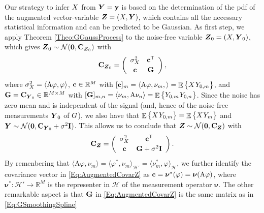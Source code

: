 \documentclass[11pt, english,english]{article}
\newcommand{\R}{ \mathbb{R}}
\def\V#1{{\boldsymbol{#1}}}         %
\def\Spc#1{{\mathcal{#1}}}  %
\def\M#1{{\bf{#1}}}  %
\def\Op#1{{\mathrm{#1}}}  %
\def\Exp{\mathop{\mathbb{E}}\nolimits}
\renewcommand{\[}{\begin{equation}}
\renewcommand{\]}[1]{\label{eq:#1}\end{equation}}
\def\Exp{\mathop{\mathbb{E}}\nolimits}
\def\Rand#1{{\uppercase{#1}}}         %
\def\VRand#1{{\uppercase{\boldsymbol #1}}}         %
\def\gRand#1{{\uppercase{ #1}}}         %
\newcommand{\Tr}{\mathsf{T}}
\begin{document}
Our strategy to infer $\Rand X$ from $\VRand Y=\M y$ is based on the determination of
the pdf of the augmented vector-variable $\VRand z=(\Rand X, \VRand Y)$, which contains all the necessary statistical information and can be predicted to be Gaussian. As first step, we apply Theorem \ref{Theo:GGaussProcess}
 to the noise-free variable  $\VRand z_0=(\Rand X, \VRand Y_0)$, which gives
$\VRand z_0\sim \Spc N(\V 0, \M C_{\VRand z_0})$ with
\begin{align}
\label{Eq:AugmentedCovar0}
\M C_{\VRand z_0}=\left(\begin{array}{cc}
\sigma_\Rand x^2  &   \M c^\Tr    \\[0.5ex]
\M c  &   \M G 
\end{array}
\right),
\end{align}
where $\sigma_\Rand x^2=\langle \Op A \varphi, \varphi\rangle$, $\M c \in \R^M$ with $[\M c]_m=\langle \Op A \varphi, \nu_m,\rangle=\Exp\big\{\Rand x\hspace{.08em}\Rand y_{0,m}\big\}$, and $\M G=\M C_{\VRand Y_0} \in \R^{M \times M}$ with $[\M G]_{m,n}=\langle \nu_m,\Op A \nu_n \rangle=\Exp\big\{\Rand y_{0,m}\hspace{.08em}\Rand y_{0,n}\big\}$.
Since the noise has zero mean and is independent of the signal (and, hence of the noise-free measurements $\VRand Y_0$ of $\gRand G$), we also have that $\Exp\big\{\Rand x\hspace{.08em}\Rand y_{0,m}\big\}=\Exp\big\{\Rand x\hspace{.08em}\Rand y_{m}\big\}$ and $\VRand Y\sim \Spc N(\V 0, \M C_{\VRand Y_0}+\sigma^2 \M I)$. This allows us to conclude that
 $\VRand z\sim \Spc N(\V 0, \M C_{\VRand z})$ with
\begin{align}
\label{Eq:AugmentedCovarZ}
\M C_{\VRand z}=\left(\begin{array}{cc}
\sigma_\Rand x^2  &   \M c^\Tr    \\[0.5ex]
\M c  &   \M G + \sigma^2 \M I 
\end{array}
\right).
\end{align}
By remenbering that $\langle \Op A \varphi, \nu_m\rangle=\langle \varphi^\ast, \nu_m\rangle_{\Spc H'}=\langle \nu^\ast_m,\varphi
\rangle_{\Spc H}$, we further identify the covariance vector in \eqref{Eq:AugmentedCovarZ} as $\M c=\V \nu^\ast(\varphi)=\V \nu(\Op A \varphi)$, where $\V \nu^\ast: \Spc H' \to \R^M$ 
is the representer in $\Spc H$ of the measurement operator $\V \nu$. The other remarkable aspect is that $\M G$ in \eqref{Eq:AugmentedCovarZ} is the same matrix as in \eqref{Eq:GSmoothingSpline}
\end{document}
